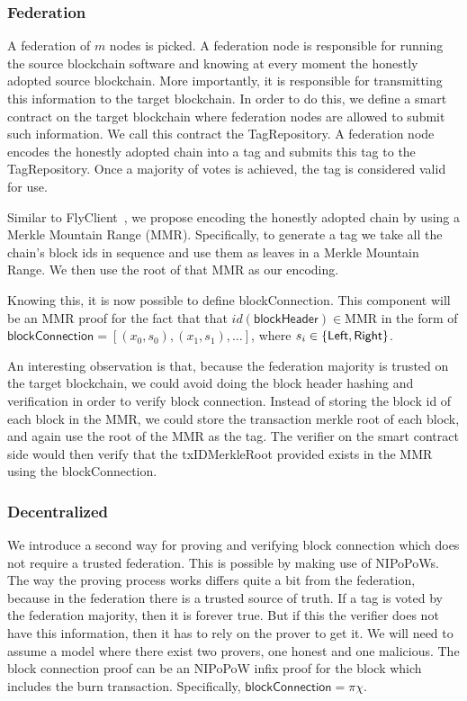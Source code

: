 \subsubsection{Federation}
A federation of $m$ nodes is picked. A federation node is responsible for running the source blockchain software and knowing at every moment the honestly adopted source blockchain. More importantly, it is responsible for transmitting this information to the target blockchain. In order to do this, we define a smart contract on the target blockchain where federation nodes are allowed to submit such information. We call this contract the \textsf{TagRepository}. A federation node encodes the honestly adopted chain into a tag and submits this tag to the \textsf{TagRepository}. Once a majority of votes is achieved, the tag is considered valid for use.

Similar to FlyClient~\cite{flyclient}, we propose encoding the honestly adopted chain by using a Merkle Mountain Range (MMR). Specifically, to generate a tag we take all the chain's block ids in sequence and use them as leaves in a Merkle Mountain Range. We then use the root of that MMR as our encoding.

Knowing this, it is now possible to define \textsf{blockConnection}. This component will be an MMR proof for the fact that that $id(\mathsf{blockHeader}) \in \text{MMR}$ in the form of $\mathsf{blockConnection} = [(x_0, s_0), (x_1, s_1), \dots]$, where $s_i \in \sf\{Left, Right\}$.

An interesting observation is that, because the federation majority is trusted on the target blockchain, we could avoid doing the block header hashing and verification in order to verify block connection. Instead of storing the block id of each block in the MMR, we could store the transaction merkle root of each block, and again use the root of the MMR as the tag. The verifier on the smart contract side would then verify that the \textsf{txIDMerkleRoot} provided exists in the MMR using the \textsf{blockConnection}.

\subsubsection{Decentralized}
We introduce a second way for proving and verifying block connection which does not require a trusted federation. This is possible by making use of NIPoPoWs. The way the proving process works differs quite a bit from the federation, because in the federation there is a trusted source of truth. If a tag is voted by the federation majority, then it is forever true. But if this the verifier does not have this information, then it has to rely on the prover to get it. We will need to assume a model where there exist two provers, one honest and one malicious. The block connection proof can be an NIPoPoW infix proof for the block which includes the burn transaction. Specifically, $\mathsf{blockConnection} = \pi\chi$.

